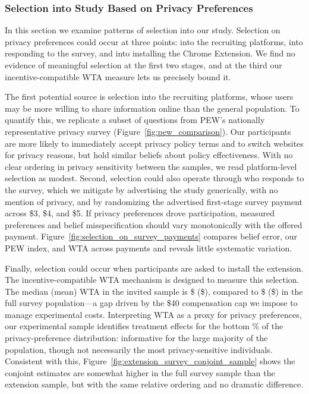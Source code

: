 \documentclass[12pt]{article}
\theoremstyle{definition}
\theoremstyle{remark}
\begin{document}
\subsubsection{Selection into Study Based on Privacy Preferences}\label{sec:selection}

In this section we examine patterns of selection into our study. Selection on privacy preferences could occur at three points: into the recruiting platforms, into responding to the survey, and into installing the Chrome Extension. We find no evidence of meaningful selection at the first two stages, and at the third our incentive-compatible WTA measure lets us precisely bound it.

The first potential source is selection into the recruiting platforms, whose users may be more willing to share information online than the general population. To quantify this, we replicate a subset of questions from PEW's nationally representative privacy survey (Figure~\ref{fig:pew_comparison}). Our participants are more likely to immediately accept privacy policy terms and to switch websites for privacy reasons, but hold similar beliefs about policy effectiveness. With no clear ordering in privacy sensitivity between the samples, we read platform-level selection as modest. Second, selection could also operate through who responds to the survey, which we mitigate by advertising the study generically, with no mention of privacy, and by randomizing the advertised first-stage survey payment across \$3, \$4, and \$5. If privacy preferences drove participation, measured preferences and belief misspecification should vary monotonically with the offered payment. Figure~\ref{fig:selection_on_survey_payments} compares belief error, our PEW index, and WTA across payments and reveals little systematic variation.

Finally, selection could occur when participants are asked to install the extension. The incentive-compatible WTA mechanism is designed to measure this selection. The median (mean) WTA in the invited sample is \$\wtaInvitedMedian{} (\$\wtaInvitedMean{}), compared to \$\wtaFullMedian{} (\$\wtaFullMean{}) in the full survey population---a gap driven by the \$40 compensation cap we impose to manage experimental costs. Interpreting WTA as a proxy for privacy preferences, our experimental sample identifies treatment effects for the bottom \invitedSampleCoveragePct{}\% of the privacy-preference distribution: informative for the large majority of the population, though not necessarily the most privacy-sensitive individuals. Consistent with this, Figure~\ref{fig:extension_survey_conjoint_sample} shows the conjoint estimates are somewhat higher in the full survey sample than the extension sample, but with the same relative ordering and no dramatic difference.
\end{document}
